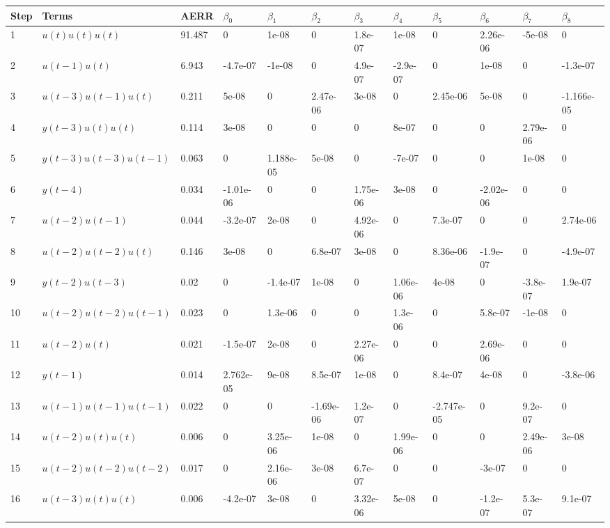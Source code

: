 \begin{tabular}{llllllllllll}
Step & Terms & AERR & $\beta_{0}$ & $\beta_{1}$ & $\beta_{2}$ & $\beta_{3}$ & $\beta_{4}$ & $\beta_{5}$ & $\beta_{6}$ & $\beta_{7}$ & $\beta_{8}$ \\ 
\hline 
1 & $u(t)u(t)u(t)$ & 91.487 & 0 & 1e-08 & 0 & 1.8e-07 & 1e-08 & 0 & 2.26e-06 & -5e-08 & 0 \\ 
2 & $u(t-1)u(t)$ & 6.943 & -4.7e-07 & -1e-08 & 0 & 4.9e-07 & -2.9e-07 & 0 & 1e-08 & 0 & -1.3e-07 \\ 
3 & $u(t-3)u(t-1)u(t)$ & 0.211 & 5e-08 & 0 & 2.47e-06 & 3e-08 & 0 & 2.45e-06 & 5e-08 & 0 & -1.166e-05 \\ 
4 & $y(t-3)u(t)u(t)$ & 0.114 & 3e-08 & 0 & 0 & 0 & 8e-07 & 0 & 0 & 2.79e-06 & 0 \\ 
5 & $y(t-3)u(t-3)u(t-1)$ & 0.063 & 0 & 1.188e-05 & 5e-08 & 0 & -7e-07 & 0 & 0 & 1e-08 & 0 \\ 
6 & $y(t-4)$ & 0.034 & -1.01e-06 & 0 & 0 & 1.75e-06 & 3e-08 & 0 & -2.02e-06 & 0 & 0 \\ 
7 & $u(t-2)u(t-1)$ & 0.044 & -3.2e-07 & 2e-08 & 0 & 4.92e-06 & 0 & 7.3e-07 & 0 & 0 & 2.74e-06 \\ 
8 & $u(t-2)u(t-2)u(t)$ & 0.146 & 3e-08 & 0 & 6.8e-07 & 3e-08 & 0 & 8.36e-06 & -1.9e-07 & 0 & -4.9e-07 \\ 
9 & $y(t-2)u(t-3)$ & 0.02 & 0 & -1.4e-07 & 1e-08 & 0 & 1.06e-06 & 4e-08 & 0 & -3.8e-07 & 1.9e-07 \\ 
10 & $u(t-2)u(t-2)u(t-1)$ & 0.023 & 0 & 1.3e-06 & 0 & 0 & 1.3e-06 & 0 & 5.8e-07 & -1e-08 & 0 \\ 
11 & $u(t-2)u(t)$ & 0.021 & -1.5e-07 & 2e-08 & 0 & 2.27e-06 & 0 & 0 & 2.69e-06 & 0 & 0 \\ 
12 & $y(t-1)$ & 0.014 & 2.762e-05 & 9e-08 & 8.5e-07 & 1e-08 & 0 & 8.4e-07 & 4e-08 & 0 & -3.8e-06 \\ 
13 & $u(t-1)u(t-1)u(t-1)$ & 0.022 & 0 & 0 & -1.69e-06 & 1.2e-07 & 0 & -2.747e-05 & 0 & 9.2e-07 & 0 \\ 
14 & $u(t-2)u(t)u(t)$ & 0.006 & 0 & 3.25e-06 & 1e-08 & 0 & 1.99e-06 & 0 & 0 & 2.49e-06 & 3e-08 \\ 
15 & $u(t-2)u(t-2)u(t-2)$ & 0.017 & 0 & 2.16e-06 & 3e-08 & 6.7e-07 & 0 & 0 & -3e-07 & 0 & 0 \\ 
16 & $u(t-3)u(t)u(t)$ & 0.006 & -4.2e-07 & 3e-08 & 0 & 3.32e-06 & 5e-08 & 0 & -1.2e-07 & 5.3e-07 & 9.1e-07 \\ 
\hline 
\end{tabular}